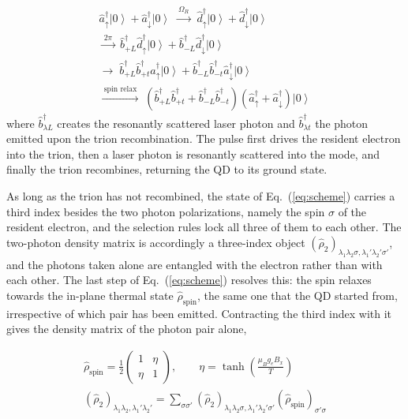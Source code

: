 \documentclass[prb,twocolumn,preprintnumbers,superscriptaddress]{revtex4-2}
\begin{document}
\begin{gather}
    \hat{a}^{\dag}_{\uparrow} \left| 0 \right> + \hat{a}^{\dag}_{\downarrow} \left| 0 \right>
    \; \xrightarrow{\ \Omega_R \ } \;
    \hat{d}^{\dag}_{\uparrow} \left| 0 \right> + \hat{d}^{\dag}_{\downarrow} \left| 0 \right>
    \label{eq:scheme}
    \\ \nonumber
    \xrightarrow{\ 2\pi \ } \;
    \hat{b}^{\dag}_{+L} \hat{d}^{\dag}_{\uparrow} \left| 0 \right>
    + \hat{b}^{\dag}_{-L} \hat{d}^{\dag}_{\downarrow} \left| 0 \right>
    \\ \nonumber
    \longrightarrow \;
    \hat{b}^{\dag}_{+L} \hat{b}^{\dag}_{+t} \hat{a}^{\dag}_{\uparrow} \left| 0 \right>
    + \hat{b}^{\dag}_{-L} \hat{b}^{\dag}_{-t} \hat{a}^{\dag}_{\downarrow} \left| 0 \right>
    \\ \nonumber
    \xrightarrow{\ \text{spin relax} \ } \;
    \left( \hat{b}^{\dag}_{+L} \hat{b}^{\dag}_{+t}
    + \hat{b}^{\dag}_{-L} \hat{b}^{\dag}_{-t} \right)
    \left( \hat{a}^{\dag}_{\uparrow} + \hat{a}^{\dag}_{\downarrow} \right) \left| 0 \right>
\end{gather}
where $\hat{b}^{\dag}_{\lambda L}$ creates the resonantly scattered laser photon and
$\hat{b}^{\dag}_{\lambda t}$ the photon emitted upon the trion recombination.
The pulse first drives the resident electron into the trion, then a laser photon is
resonantly scattered into the mode, and finally the trion recombines, returning the
QD to its ground state.

As long as the trion has not recombined, the state of Eq.~(\ref{eq:scheme}) carries a
third index besides the two photon polarizations, namely the spin $\sigma$ of the
resident electron, and the selection rules lock all three of them to each other.
The two-photon density matrix is accordingly a three-index object
$( \hat{\rho}_2 )_{\lambda_1 \lambda_2 \sigma , \lambda_1' \lambda_2' \sigma'}$, and
the photons taken alone are entangled with the electron rather than with each other.
The last step of Eq.~(\ref{eq:scheme}) resolves this: the spin relaxes towards the
in-plane thermal state $\hat{\rho}_{\text{spin}}$, the same one that the QD started
from, irrespective of which pair has been emitted.
Contracting the third index with it gives the density matrix of the photon pair
alone,

\begin{gather}
    \hat{\rho}_{\text{spin}} = \frac{1}{2}
    \begin{pmatrix}
        1 & \eta \\
        \eta & 1
    \end{pmatrix} , \qquad
    \eta = \tanh \left( \frac{\mu_B g_e B_x}{T} \right)
    \label{eq:spin-contraction}
    \\ \nonumber
    \left( \hat{\rho}_2 \right)_{\lambda_1 \lambda_2 , \lambda_1' \lambda_2'} =
    \sum_{\sigma \sigma'}
    \left( \hat{\rho}_2 \right)_{\lambda_1 \lambda_2 \sigma , \lambda_1' \lambda_2' \sigma'}
    \left( \hat{\rho}_{\text{spin}} \right)_{\sigma' \sigma}
\end{gather}
\end{document}

